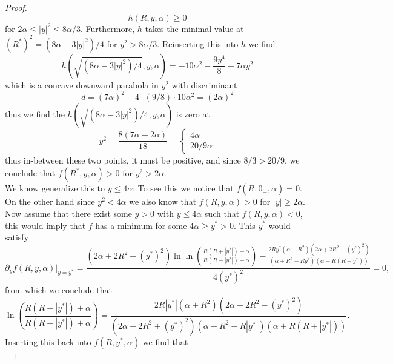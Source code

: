 \documentclass[a4paper,11pt]{article}
\newcommand{\abs}[1]{\left\lvert #1 \right\rvert}
\numberwithin{equation}{section}
\begin{document}
\begin{proof}
\begin{equation}
	h(R,y,\alpha)\geq0
	\end{equation}
	for $ 2\alpha\leq\abs{y}^2\leq8\alpha/3 $. Furthermore, $ h $ takes the minimal value at $ (R^*)^2=(8\alpha-3\abs{y}^2)/4 $ for $ y^2>8\alpha/3 $. Reinserting this into $ h $ we find \begin{equation}
	h\left(\sqrt{(8\alpha-3\abs{y}^2)/4},y,\alpha\right)=-10 \alpha ^2-\frac{9 y^4}{8}+7 \alpha  y^2
	\end{equation} 
	which is a concave downward parabola in $ y^2 $ with discriminant \begin{equation}
	d=(7\alpha)^2-4\cdot(9/8)\cdot 10\alpha^2=(2\alpha)^2
	\end{equation}
	thus we find the $ h\left(\sqrt{(8\alpha-3\abs{y}^2)/4},y,\alpha\right) $ is zero at \begin{equation}
	y^2=\frac{8(7\alpha\mp 2\alpha)}{18}=\begin{cases}
	4\alpha\\
	20/9\alpha
	\end{cases}
	\end{equation}
	thus in-between these two points, it must be positive, and since $ 8/3>20/9 $, we conclude that $ f(R^*,y,\alpha)>0 $ for $ y^2>2\alpha $. \\ 
	We know generalize this to $ y\leq4\alpha $:
	 To see this we notice that $ f(R,0_+,\alpha)=0 $. On the other hand since $ y^2<4\alpha $ we also know that $ f(R,y,\alpha)>0 $ for $ \abs{y}\geq2\alpha $. Now assume that there exist some $ y>0 $ with $ y\leq4\alpha $ such that $ f(R,y,\alpha)<0 $, this would imply that $ f $ has a minimum for some $ 4\alpha\geq y^*>0 $. This $ y^* $ would satisfy\begin{equation}
	\partial_yf(R,y,\alpha)\rvert_{y=y^*}=\frac{\left(2 \alpha +2 	R^2+(y^*)^2\right) \ln \ln\left(\frac{R(R+\abs{y^*})+\alpha}{R(R-\abs{y^*})+\alpha}\right)-\frac{2 R y^* \left(\alpha +R^2\right) \left(2 \alpha +2
		R^2-(y^*)^2\right)}{\left(\alpha +R^2-R y^*\right) (\alpha +R (R+y^*))}}{4 (y^*)^2}=0,
	\end{equation}
	from which we conclude that \begin{equation}
	\ln\left(\frac{R(R+\abs{y^*})+\alpha}{R(R-\abs{y^*})+\alpha}\right)=\frac{2 R \abs{y^*} \left(\alpha +R^2\right) \left(2 \alpha +2
		R^2-(y^*)^2\right)}{\left(2 \alpha +2 	R^2+(y^*)^2\right)\left(\alpha +R^2-R \abs{y^*}\right) (\alpha +R (R+\abs{y^*}))}.
	\end{equation}
	Inserting this back into $ f(R,y^*,\alpha) $ we find that \begin{equation}

\end{equation}
\end{proof}
\end{document}

